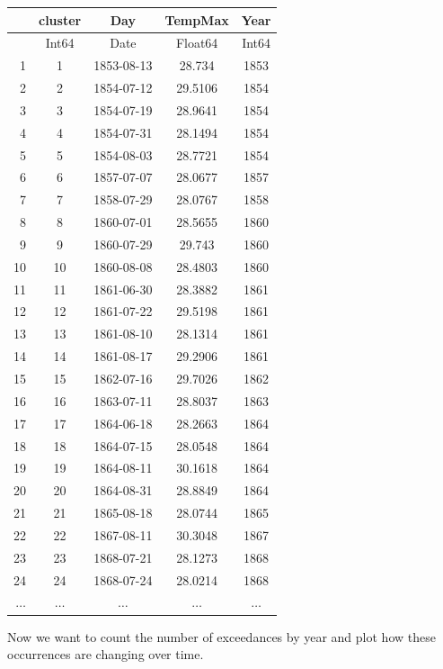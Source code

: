 \documentclass[
  letterpaper,
  DIV=11,
  numbers=noendperiod]{scrartcl}
\begin{document}
\begin{tabular}{r|cccc}
    & cluster & Day & TempMax & Year\\
    \hline
    & Int64 & Date & Float64 & Int64\\
    \hline
    1 & 1 & 1853-08-13 & 28.734 & 1853 \\
    2 & 2 & 1854-07-12 & 29.5106 & 1854 \\
    3 & 3 & 1854-07-19 & 28.9641 & 1854 \\
    4 & 4 & 1854-07-31 & 28.1494 & 1854 \\
    5 & 5 & 1854-08-03 & 28.7721 & 1854 \\
    6 & 6 & 1857-07-07 & 28.0677 & 1857 \\
    7 & 7 & 1858-07-29 & 28.0767 & 1858 \\
    8 & 8 & 1860-07-01 & 28.5655 & 1860 \\
    9 & 9 & 1860-07-29 & 29.743 & 1860 \\
    10 & 10 & 1860-08-08 & 28.4803 & 1860 \\
    11 & 11 & 1861-06-30 & 28.3882 & 1861 \\
    12 & 12 & 1861-07-22 & 29.5198 & 1861 \\
    13 & 13 & 1861-08-10 & 28.1314 & 1861 \\
    14 & 14 & 1861-08-17 & 29.2906 & 1861 \\
    15 & 15 & 1862-07-16 & 29.7026 & 1862 \\
    16 & 16 & 1863-07-11 & 28.8037 & 1863 \\
    17 & 17 & 1864-06-18 & 28.2663 & 1864 \\
    18 & 18 & 1864-07-15 & 28.0548 & 1864 \\
    19 & 19 & 1864-08-11 & 30.1618 & 1864 \\
    20 & 20 & 1864-08-31 & 28.8849 & 1864 \\
    21 & 21 & 1865-08-18 & 28.0744 & 1865 \\
    22 & 22 & 1867-08-11 & 30.3048 & 1867 \\
    23 & 23 & 1868-07-21 & 28.1273 & 1868 \\
    24 & 24 & 1868-07-24 & 28.0214 & 1868 \\
    $\dots$ & $\dots$ & $\dots$ & $\dots$ & $\dots$ \\
\end{tabular}

Now we want to count the number of exceedances by year and plot how
these occurrences are changing over time.
\end{document}
